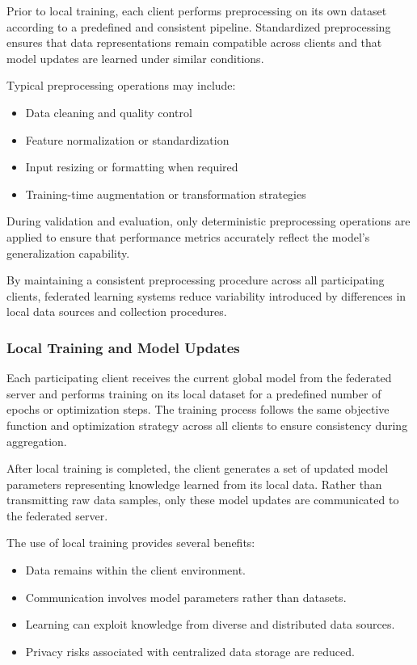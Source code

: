 Prior to local training, each client performs preprocessing on its own dataset according to a predefined and consistent pipeline. Standardized preprocessing ensures that data representations remain compatible across clients and that model updates are learned under similar conditions.

Typical preprocessing operations may include:

\begin{itemize}
	\item Data cleaning and quality control
	\item Feature normalization or standardization
	\item Input resizing or formatting when required
	\item Training-time augmentation or transformation strategies
\end{itemize}

During validation and evaluation, only deterministic preprocessing operations are applied to ensure that performance metrics accurately reflect the model's generalization capability.

By maintaining a consistent preprocessing procedure across all participating clients, federated learning systems reduce variability introduced by differences in local data sources and collection procedures.

\subsubsection{Local Training and Model Updates}

Each participating client receives the current global model from the federated server and performs training on its local dataset for a predefined number of epochs or optimization steps. The training process follows the same objective function and optimization strategy across all clients to ensure consistency during aggregation.

After local training is completed, the client generates a set of updated model parameters representing knowledge learned from its local data. Rather than transmitting raw data samples, only these model updates are communicated to the federated server.

The use of local training provides several benefits:

\begin{itemize}
	\item Data remains within the client environment.
	\item Communication involves model parameters rather than datasets.
	\item Learning can exploit knowledge from diverse and distributed data sources.
	\item Privacy risks associated with centralized data storage are reduced.
\end{itemize}

